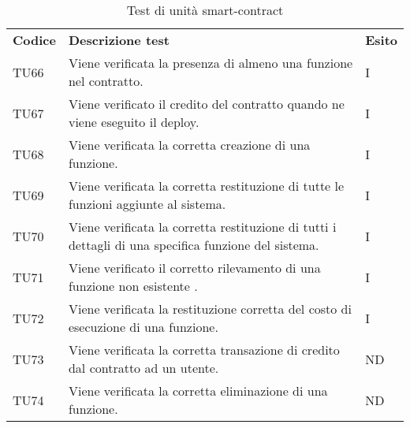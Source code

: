 \renewcommand{\arraystretch}{1.5}
\begin{longtable}{|C{1.5cm}|C{10cm}|C{1.5cm}|}

	\caption{Test di unità smart-contract}\\
	\hline

	\textbf{Codice} & \textbf{Descrizione test}  & \textbf{Esito}
	\tabularnewline
	\endfirsthead

	TU66 &
	Viene verificata la presenza di almeno una funzione nel contratto.  &
	I \\

	TU67 &
	Viene verificato il credito del contratto quando ne viene eseguito il deploy.  &
	I \\

	TU68 &
	Viene verificata la corretta creazione di una funzione.  &
	I \\

	TU69 &
	Viene verificata la corretta restituzione di tutte le funzioni aggiunte al sistema.  &
	I \\

	TU70 &
	Viene verificata la corretta restituzione di tutti i dettagli di una specifica funzione del sistema.  &
	I \\

	TU71 &
	Viene verificato il corretto rilevamento di una funzione non esistente .  &
	I \\


	TU72 &
	Viene verificata la restituzione corretta del costo  di esecuzione di una funzione.  &
	I \\



	TU73 &
	Viene verificata la corretta transazione di credito dal contratto ad un utente.  &
	ND \\

	TU74 &
	Viene verificata la corretta eliminazione di una funzione.  &
	ND \\


\end{longtable}

